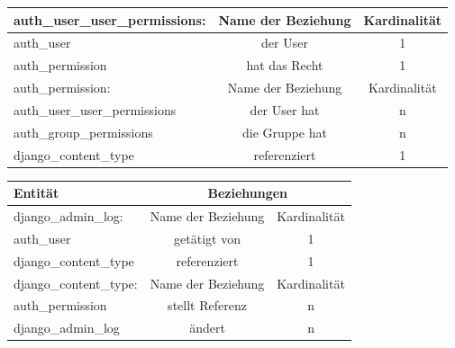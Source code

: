 \begin{tabular}[ht]{|l||c|c|}
  auth\_user\_user\_permissions:  & Name der Beziehung &  Kardinalit\"at\\
  \hline\hline
  auth\_user & der User & 1 \\
  \hline
  auth\_permission & hat das Recht & 1 \\
  \hline\hline\hline 
  
  auth\_permission:  & Name der Beziehung &  Kardinalit\"at\\
  \hline\hline
  auth\_user\_user\_permissions & der User hat  & n \\
  \hline
  auth\_group\_permissions & die Gruppe hat & n \\
  \hline
  django\_content\_type & referenziert & 1 \\
  \hline
\end{tabular}

\begin{tabular}[ht]{|l||c|c|}
  \hline
  Entit\"at & \multicolumn{2}{c|}{Beziehungen} \\
  \hline\hline\hline
  
  django\_admin\_log:  & Name der Beziehung &  Kardinalit\"at\\
  \hline\hline
  auth\_user & getätigt von  & 1 \\
  \hline
  django\_content\_type & referenziert & 1 \\
  \hline\hline\hline
  
  django\_content\_type:  & Name der Beziehung &  Kardinalit\"at\\
  \hline\hline
  auth\_permission & stellt Referenz  & n \\
  \hline
  django\_admin\_log & ändert & n \\
  \hline\hline\hline
\end{tabular}
